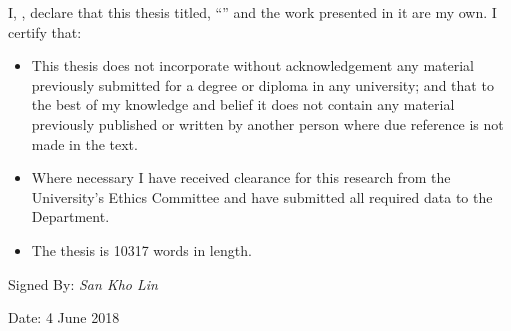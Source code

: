 \documentclass[
11pt, %
oneside, %
english, %
singlespacing, %
headsepline, %
chapterinoneline, %
consistentlayout, %
]{MastersDoctoralThesis} %
\begin{document}
\begin{declaration}
\addchaptertocentry{\authorshipname} %

\noindent I, \authorname, declare that this thesis titled, \enquote{\ttitle} and the work presented in it are my own. I certify that:

\begin{itemize} 
\item This thesis does not incorporate without acknowledgement any material previously submitted for a degree or diploma in any university; and that to the best of my knowledge and belief it does not contain any material previously published or written by another person where due reference is not made in the text.
\item Where necessary I have received clearance for this research from the University's Ethics Committee and have submitted all required data to the Department.
\item The thesis is 10317 words in length.\\ %
\end{itemize}
 
\noindent Signed By:  \emph{San Kho Lin}
 
\noindent Date: 4 June 2018
\end{declaration}

\cleardoublepage





\end{document}
